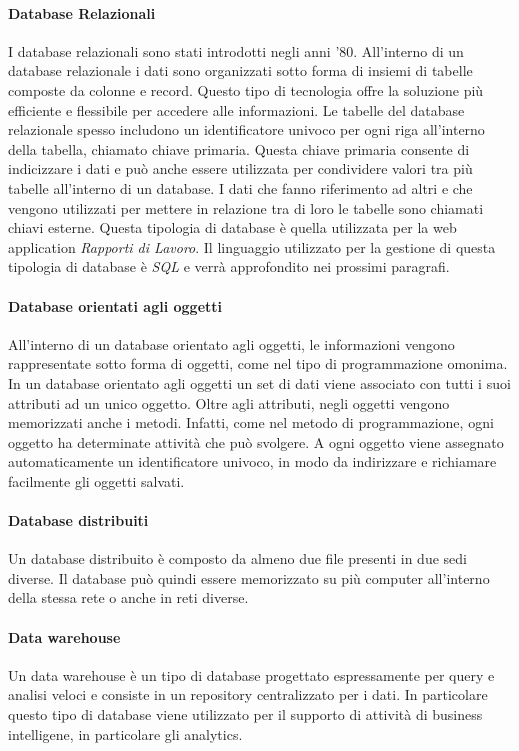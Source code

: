   \paragraph{Database Relazionali}
  I database relazionali sono stati introdotti negli anni '80. All'interno di un database relazionale i dati sono organizzati
  sotto forma di insiemi di tabelle composte da colonne e record. Questo tipo di tecnologia offre la soluzione più
  efficiente e flessibile per accedere alle informazioni. Le tabelle del database relazionale spesso includono un
  identificatore univoco per ogni riga all'interno della tabella, chiamato chiave primaria. Questa chiave primaria consente
  di indicizzare i dati e può anche essere utilizzata per condividere valori tra più tabelle all'interno di un database. I dati
  che fanno riferimento ad altri e che vengono utilizzati per mettere in relazione tra di loro le tabelle sono chiamati chiavi
  esterne. Questa tipologia di database è quella utilizzata per la web application \textit{Rapporti di Lavoro}. Il linguaggio
  utilizzato per la gestione di questa tipologia di database è \textit{SQL} e verrà approfondito nei prossimi paragrafi.
  \paragraph{Database orientati agli oggetti}
  All'interno di un database orientato agli oggetti, le informazioni vengono rappresentate sotto forma di oggetti,
  come nel tipo di programmazione omonima. In un database orientato agli oggetti un set di dati viene associato con tutti 
  i suoi attributi ad un unico oggetto. Oltre agli attributi, negli oggetti vengono memorizzati anche i metodi. Infatti, 
  come nel metodo di programmazione, ogni oggetto ha determinate attività che può svolgere. A ogni oggetto viene 
  assegnato automaticamente un identificatore univoco, in modo da indirizzare e richiamare facilmente gli oggetti salvati.
  \paragraph{Database distribuiti}
  Un database distribuito è composto da almeno due file presenti in due sedi diverse. Il database 
  può quindi essere memorizzato su più computer all'interno della stessa rete o anche in reti diverse.
  \paragraph{Data warehouse}
  Un data warehouse è un tipo di database progettato espressamente per query e analisi veloci e consiste in un
  repository centralizzato per i dati. In particolare questo tipo di database viene utilizzato per il supporto di 
  attività di business intelligene, in particolare gli analytics.
